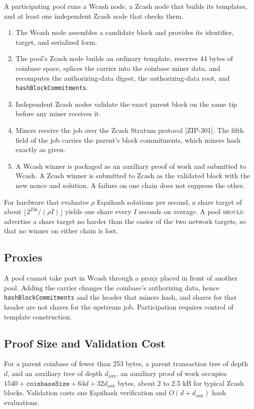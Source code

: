 \documentclass[10pt,letterpaper]{article}
\newcommand\SHOULD{\textsc{should}}
\theoremstyle{plain}
\begin{document}
A participating pool runs a Wcash node, a Zcash node that builds its templates, and at least one independent Zcash node that checks them.
\begin{enumerate}
\item The Wcash node assembles a candidate block and provides its identifier, target, and serialized form.
\item The pool's Zcash node builds an ordinary template, reserves 44 bytes of coinbase space, splices the carrier into the coinbase miner data, and recomputes the authorizing-data digest, the authorizing-data root, and \texttt{hashBlockCommitments}.
\item Independent Zcash nodes validate the exact parent block on the same tip before any miner receives it.
\item Miners receive the job over the Zcash Stratum protocol [ZIP-301]. The fifth field of the job carries the parent's block commitments, which miners hash exactly as given.
\item A Wcash winner is packaged as an auxiliary proof of work and submitted to Wcash. A Zcash winner is submitted to Zcash as the validated block with the new nonce and solution. A failure on one chain does not suppress the other.
\end{enumerate}
For hardware that evaluates $\rho$ Equihash solutions per second, a share target of about $\lfloor 2^{256}/(\rho I) \rfloor$ yields one share every $I$ seconds on average. A pool \SHOULD{} advertise a share target no harder than the easier of the two network targets, so that no winner on either chain is lost.

\subsection{Proxies}\label{sec:proxies}

A pool cannot take part in Wcash through a proxy placed in front of another pool. Adding the carrier changes the coinbase's authorizing data, hence \texttt{hashBlockCommitments} and the header that miners hash, and shares for that header are not shares for the upstream job. Participation requires control of template construction.

\subsection{Proof Size and Validation Cost}\label{sec:overhead}

For a parent coinbase of fewer than 253 bytes, a parent transaction tree of depth $d$, and an auxiliary tree of depth $d_{\mathrm{aux}}$, an auxiliary proof of work occupies $1540 + \mathtt{coinbaseSize} + 64d + 32d_{\mathrm{aux}}$ bytes, about 2 to 2.5 kB for typical Zcash blocks. Validation costs one Equihash verification and $O(d + d_{\mathrm{aux}})$ hash evaluations.
\end{document}
